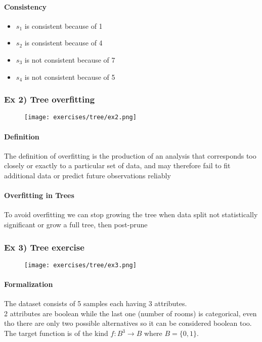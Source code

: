 \paragraph{Consistency}
\begin{itemize}
\item $s_1$ is consistent because of  1 
\item $s_2$ is consistent because of  4
\item $s_3$ is not consistent because of  7 
\item $s_4$ is not consistent because of  5
\end{itemize}

\subsubsection{Ex 2) Tree overfitting}
\begin{figure}[H]
    \centering
    \texttt{[image: exercises/tree/ex2.png]}
\end{figure}

\paragraph{Definition}
The definition of overfitting is the production of an analysis that corresponds too closely or exactly to a particular set of data, and may therefore fail to fit additional data or predict future observations reliably

\paragraph{Overfitting in Trees}
To avoid overfitting we can stop growing the tree when data split not statistically significant  or grow a full tree, then post-prune

\subsubsection{Ex 3) Tree exercise}
\begin{figure}[H]
    \centering
    \texttt{[image: exercises/tree/ex3.png]}
\end{figure}

\paragraph{Formalization}
The dataset consists of  5 samples each having 3 attributes.\\
2 attributes are boolean while the last one (number of rooms) is categorical, even tho there are only two possible alternatives so it can be considered boolean too.\\
The target function is of the kind $f:B^3 \to B$ where $B=\{0,1\}$.

